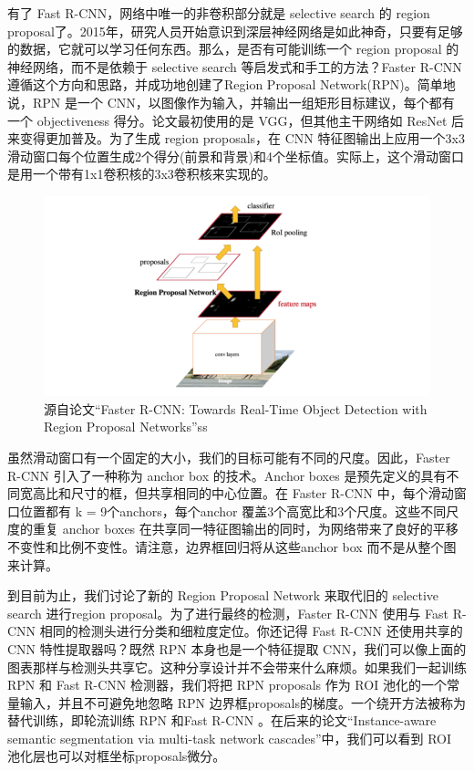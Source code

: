 \documentclass{article}
\begin{document}
	   	有了 Fast R-CNN，网络中唯一的非卷积部分就是 selective search 的 region proposal了。2015年，研究人员开始意识到深层神经网络是如此神奇，只要有足够的数据，它就可以学习任何东西。那么，是否有可能训练一个 region proposal 的神经网络，而不是依赖于 selective search 等启发式和手工的方法？Faster R-CNN 遵循这个方向和思路，并成功地创建了Region Proposal Network(RPN)。简单地说，RPN 是一个 CNN，以图像作为输入，并输出一组矩形目标建议，每个都有一个 objectiveness 得分。论文最初使用的是 VGG，但其他主干网络如 ResNet 后来变得更加普及。为了生成 region proposals，在 CNN 特征图输出上应用一个3x3滑动窗口每个位置生成2个得分(前景和背景)和4个坐标值。实际上，这个滑动窗口是用一个带有1x1卷积核的3x3卷积核来实现的。
	   	
	   	\begin{figure}[htpb]
	   		\centering
	   		\includegraphics[width=\linewidth]{detectfig/4.png}
	   		\caption{源自论文“Faster R-CNN: Towards Real-Time Object Detection with Region Proposal Networks”ss}
	   	\end{figure}
   	
	   	虽然滑动窗口有一个固定的大小，我们的目标可能有不同的尺度。因此，Faster R-CNN 引入了一种称为 anchor box 的技术。Anchor boxes 是预先定义的具有不同宽高比和尺寸的框，但共享相同的中心位置。在 Faster R-CNN 中，每个滑动窗口位置都有 k = 9个anchors，每个anchor 覆盖3个高宽比和3个尺度。这些不同尺度的重复 anchor boxes 在共享同一特征图输出的同时，为网络带来了良好的平移不变性和比例不变性。请注意，边界框回归将从这些anchor box 而不是从整个图来计算。
	   	
	   	到目前为止，我们讨论了新的 Region Proposal Network 来取代旧的 selective search 进行region proposal。为了进行最终的检测，Faster R-CNN 使用与 Fast R-CNN 相同的检测头进行分类和细粒度定位。你还记得 Fast R-CNN 还使用共享的 CNN 特性提取器吗？既然 RPN 本身也是一个特征提取 CNN，我们可以像上面的图表那样与检测头共享它。这种分享设计并不会带来什么麻烦。如果我们一起训练 RPN 和 Fast R-CNN 检测器，我们将把 RPN proposals 作为 ROI 池化的一个常量输入，并且不可避免地忽略 RPN 边界框proposals的梯度。一个绕开方法被称为替代训练，即轮流训练 RPN 和Fast R-CNN 。在后来的论文“Instance-aware semantic segmentation via multi-task network cascades”中，我们可以看到 ROI 池化层也可以对框坐标proposals微分。
	   	
\end{document}
